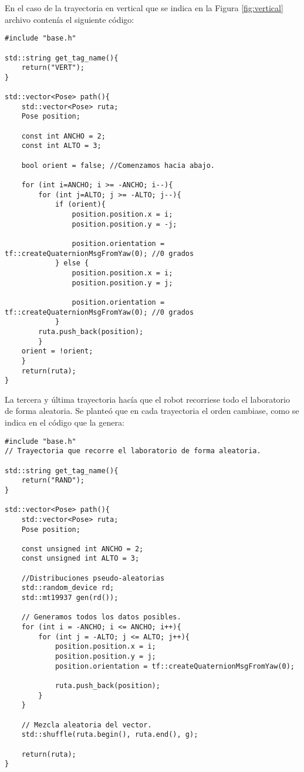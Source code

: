 En el caso de la trayectoria en vertical que se indica en la Figura \ref{fig:vertical} archivo contenía el siguiente código:

\begin{lstlisting}
#include "base.h"

std::string get_tag_name(){
    return("VERT");
}

std::vector<Pose> path(){
    std::vector<Pose> ruta;
    Pose position;

    const int ANCHO = 2;
    const int ALTO = 3;

    bool orient = false; //Comenzamos hacia abajo.

    for (int i=ANCHO; i >= -ANCHO; i--){
        for (int j=ALTO; j >= -ALTO; j--){
            if (orient){
                position.position.x = i;
                position.position.y = -j;

                position.orientation = tf::createQuaternionMsgFromYaw(0); //0 grados
            } else {
                position.position.x = i;
                position.position.y = j;

                position.orientation = tf::createQuaternionMsgFromYaw(0); //0 grados
            }
        ruta.push_back(position);
        }
    orient = !orient;
    }
    return(ruta);
}
\end{lstlisting}

La tercera y última trayectoria hacía que el robot recorriese todo el laboratorio de forma aleatoria.
Se planteó que en cada trayectoria el orden cambiase, como se indica en el código que la genera:
\begin{lstlisting}
#include "base.h"
// Trayectoria que recorre el laboratorio de forma aleatoria.

std::string get_tag_name(){
    return("RAND");
}

std::vector<Pose> path(){
    std::vector<Pose> ruta;
    Pose position;

    const unsigned int ANCHO = 2;
    const unsigned int ALTO = 3;

    //Distribuciones pseudo-aleatorias
    std::random_device rd;
    std::mt19937 gen(rd());

    // Generamos todos los datos posibles.
    for (int i = -ANCHO; i <= ANCHO; i++){
        for (int j = -ALTO; j <= ALTO; j++){
            position.position.x = i;
            position.position.y = j;
            position.orientation = tf::createQuaternionMsgFromYaw(0);

            ruta.push_back(position);
        }
    }

    // Mezcla aleatoria del vector.
    std::shuffle(ruta.begin(), ruta.end(), g);

    return(ruta);
}    
\end{lstlisting}

